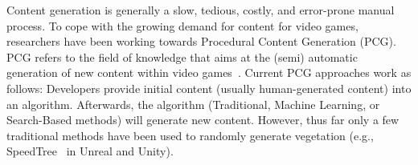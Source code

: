 

Content generation is generally a slow, tedious, costly, and error-prone manual process. To cope with the growing demand for content for video games, researchers have been working towards Procedural Content Generation (PCG). PCG refers to the field of knowledge that aims at the (semi) automatic generation of new content within video games~\cite{hendrikx2013procedural}. Current PCG approaches work as follows: Developers provide initial content (usually human-generated content) into an algorithm. Afterwards, the algorithm (Traditional, Machine Learning, or Search-Based methods) will generate new content. 
However, thus far only a few traditional methods have been used to randomly generate vegetation (e.g., SpeedTree~\cite{speedtreeweb} in Unreal and Unity).


